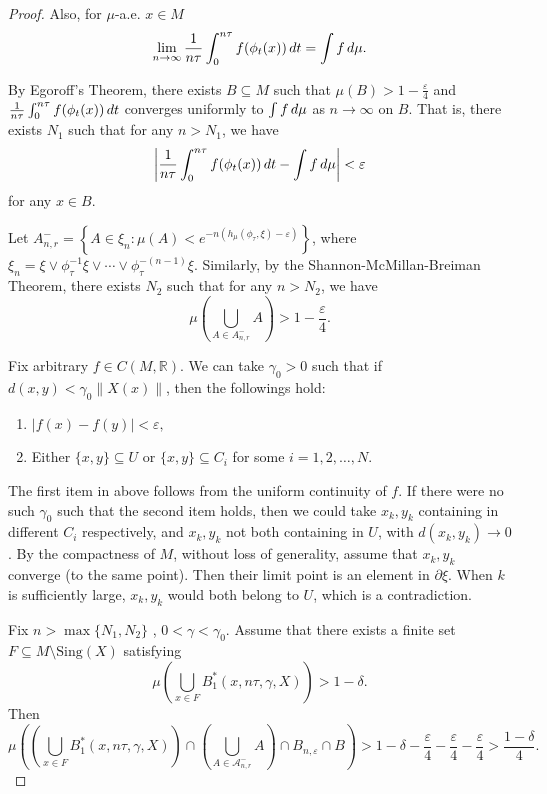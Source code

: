 \documentclass[10pt,a4paper]{amsart}
\begin{document}
\begin{proof}
Also, for \( \mu \)-a.e. \( x \in M \)
\[
\lim_{n \to \infty} \frac{1}{n\tau} \int_0^{n\tau} f(\phi_{ t}(x)) \, {\rm d}t= \int f \, {\rm d}\mu.
\]

\noindent
By Egoroff's Theorem, there exists \( B \subseteq M \) such that \( \mu(B) > 1 - \frac{\varepsilon}{4} \) and \( \frac{1}{n\tau} \int_0^{n\tau} f(\phi_{ t}(x)) \, {\rm d}t \) converges uniformly to \( \int f \, {\rm d}\mu \) as \( n \to \infty \) on \( B \). That is, there exists \( N_1 \) such that for any \( n > N_1 \), we have
\[
\left| \frac{1}{n\tau} \int_0^{n\tau} f(\phi_{ t}(x)) \,{\rm d} t - \int f \, {\rm d}\mu \right| < \varepsilon
\]
for any \( x \in B \).

Let \( A_{n, r}^- = \left\{ A \in  \xi_n : \mu(A) < e^{-n(h_\mu(\phi_\tau, \xi) - \varepsilon)} \right\} \), where \( \xi_n = \xi \vee \phi_{\tau}^{-1} \xi \vee \cdots \vee \phi_{\tau}^{-(n-1)} \xi \). Similarly, by the Shannon-McMillan-Breiman Theorem, there exists \( N_2 \) such that for any \( n > N_2 \), we have
\[
\mu\left( \bigcup_{A \in A^-_{n, r}} A \right) > 1 - \frac{\varepsilon}{4}.
\]

Fix arbitrary $f\in C(M, \mathbb{R})$. We can take \( \gamma_0 > 0 \) such that if \( d(x, y) < \gamma_0 \|X(x)\| \), then the followings hold:
\begin{enumerate}
\item[1.]
    \(
    |f(x) - f(y)| < \varepsilon,
    \)
\item[2.]
    Either  \( \{x, y\} \subseteq U \) or  \( \{x, y\} \subseteq C_i \) for some \( i = 1, 2, \ldots, N \).
\end{enumerate}

The first item in above follows from the uniform continuity of \( f \). If there were no such \( \gamma_0 \) such that the second item holds, then we could take \( x_k, y_k \) containing in different \( C_i \) respectively, and \( x_k, y_k \) not both containing in \( U \), with \( d(x_k, y_k) \to 0 \). By the compactness of $M$, without loss of generality, assume that \( x_k, y_k \) converge (to the same point). Then their limit point is an element in \( \partial{\xi} \). When \( k \) is sufficiently large, \( x_k, y_k \) would both belong to \( U \), which is a contradiction.

Fix \( n > \max\{N_1, N_2\} \) , \( 0 < \gamma < \gamma_0 \). Assume that there exists a finite set \( F \subseteq M \setminus \text{Sing}(X) \) satisfying
\[
\mu\left( \bigcup_{x \in F} B_1^*(x, n\tau, \gamma, X) \right) > 1 - \delta.
\]
Then
\[
\mu\left( \left( \bigcup_{x \in F} B_1^*(x, n\tau, \gamma, X) \right) \cap \left( \bigcup_{A \in \mathcal{A}^-_{n, r}} A \right) \cap B_{n, \varepsilon} \cap B \right) > 1 - \delta - \frac{\varepsilon}{4} - \frac{\varepsilon}{4} - \frac{\varepsilon}{4}> \frac{1 - \delta}{4}.
\]


\end{proof}
\end{document}
